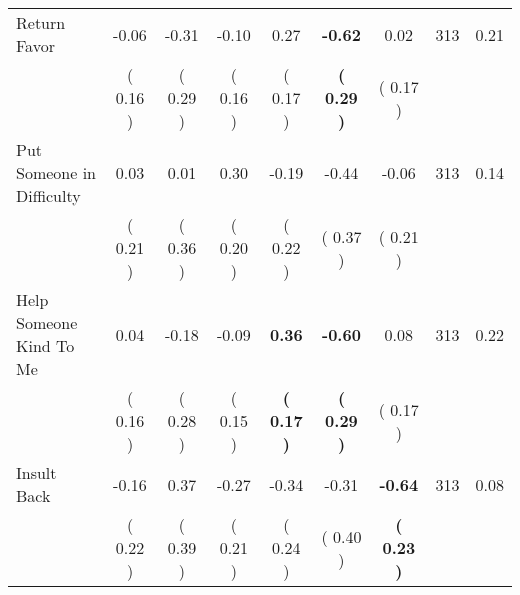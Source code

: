 \begin{tabular}{lcccccccc}
Return Favor &     -0.06 &     -0.31 &     -0.10 &      0.27 & \textbf{    -0.62} &      0.02 & 313 &       0.21 \\ 
 & (     0.16 ) & (     0.29 ) & (     0.16 ) & (     0.17 ) & \textbf{(     0.29 )} & (     0.17 ) & \\
Put Someone in Difficulty &      0.03 &      0.01 &      0.30 &     -0.19 &     -0.44 &     -0.06 & 313 &       0.14 \\ 
 & (     0.21 ) & (     0.36 ) & (     0.20 ) & (     0.22 ) & (     0.37 ) & (     0.21 ) & \\
Help Someone Kind To Me &      0.04 &     -0.18 &     -0.09 & \textbf{     0.36} & \textbf{    -0.60} &      0.08 & 313 &       0.22 \\ 
 & (     0.16 ) & (     0.28 ) & (     0.15 ) & \textbf{(     0.17 )} & \textbf{(     0.29 )} & (     0.17 ) & \\
Insult Back &     -0.16 &      0.37 &     -0.27 &     -0.34 &     -0.31 & \textbf{    -0.64} & 313 &       0.08 \\ 
 & (     0.22 ) & (     0.39 ) & (     0.21 ) & (     0.24 ) & (     0.40 ) & \textbf{(     0.23 )} & \\
\bottomrule
\end{tabular}

